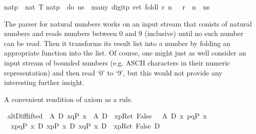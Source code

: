\begin{isabellebody}
\isamarkupfalse%
\isamarkupfalse%
\isamarkupfalse%
\isamarkupfalse%
\isamarkupfalse%
\isamarkupfalse%
\isamarkupfalse%
\isamarkupfalse%
\isanewline
\isamarkupfalse%
\isanewline
natp\ {\isacharcolon}{\isacharcolon}\ {\isachardoublequote}nat\ T{\isachardoublequote}\isanewline
{\isachardoublequote}natp\ {\isasymequiv}\ do\ {\isacharbraceleft}ns\ {\isasymleftarrow}\ many{}\ digitp{\isacharsemicolon}\ ret\ {\isacharparenleft}foldl\ {\isacharparenleft}{\isasymlambda}r\ n{\isachardot}\ {}{}\ {\isacharasterisk}\ r\ {\isacharplus}\ n{\isacharparenright}\ {}\ ns{\isacharparenright}{\isacharbraceright}{\isachardoublequote}\isamarkupfalse%
%
\begin{isamarkuptext}%
The parser for natural numbers  works on an input stream
  that conists of natural numbers and reads numbers between 0 and 9 (inclusive) until 
  no such number can be read. Then it transforms its result list into a number
  by folding an appropriate function into the list. Of course, one might just as
  well consider an input stream of bounded numbers (e.g. ASCII characters in their
  numeric representation) and then read `0' to `9', but this would not 
  provide any interesting further insight.%
\end{isamarkuptext}%
\isamarkuptrue%
%
\isamarkuptrue%
%
\begin{isamarkuptext}%
A convenient rendition of axiom  as a rule.%
\end{isamarkuptext}%
\isamarkuptrue%
\ altD{\isacharunderscore}iff{\isacharunderscore}lifted{}{\isacharcolon}\ {\isachardoublequote}{\isasymlbrakk}{\isasymturnstile}\ A\ {\isasymlongrightarrow}\isactrlsub D\ {\isasymlangle}x{\isasymleftarrow}q{\isasymrangle}{\isacharparenleft}P\ x{\isacharparenright}{\isacharsemicolon}\ {\isasymturnstile}\ A\ {\isasymlongrightarrow}\isactrlsub D\ {\isacharbrackleft}{\isacharhash}\ x{\isasymleftarrow}p{\isacharbrackright}{\isacharparenleft}Ret\ False{\isacharparenright}{\isasymrbrakk}\ {\isasymLongrightarrow}\ {\isasymturnstile}\ A\ {\isasymlongrightarrow}\isactrlsub D\ {\isasymlangle}x{\isasymleftarrow}\ p{\isasymparallel}q{\isasymrangle}{\isacharparenleft}P\ x{\isacharparenright}{\isachardoublequote}\isanewline
\isamarkupfalse%
\ {\isacharminus}\ \isanewline
\ \ \isamarkupfalse%
\ {\isachardoublequote}{\isasymturnstile}\ {\isacharparenleft}{\isasymlangle}x{\isasymleftarrow}p{\isasymparallel}q{\isasymrangle}{\isacharparenleft}P\ x{\isacharparenright}\ {\isasymlongleftrightarrow}\isactrlsub D\ {\isasymlangle}x{\isasymleftarrow}p{\isasymrangle}{\isacharparenleft}P\ x{\isacharparenright}\ {\isasymor}\isactrlsub D\ {\isasymlangle}x{\isasymleftarrow}q{\isasymrangle}{\isacharparenleft}P\ x{\isacharparenright}\ {\isasymand}\isactrlsub D\ {\isacharbrackleft}{\isacharhash}\ x{\isasymleftarrow}p{\isacharbrackright}{\isacharparenleft}Ret\ False{\isacharparenright}{\isacharparenright}\ {\isasymlongrightarrow}\isactrlsub D\isanewline

\end{isabellebody}
